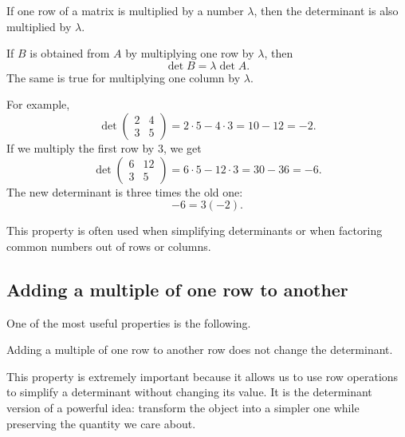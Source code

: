 If one row of a matrix is multiplied by a number \(\lambda\), then the determinant is also multiplied by \(\lambda\).

\begin{theorembox}
If \(B\) is obtained from \(A\) by multiplying one row by \(\lambda\), then
\[
\det B=\lambda \det A.
\]
The same is true for multiplying one column by \(\lambda\).
\end{theorembox}

For example,
\[
\det\begin{pmatrix}
2&4\\
3&5
\end{pmatrix}=2\cdot5-4\cdot3=10-12=-2.
\]
If we multiply the first row by \(3\), we get
\[
\det\begin{pmatrix}
6&12\\
3&5
\end{pmatrix}=6\cdot5-12\cdot3=30-36=-6.
\]
The new determinant is three times the old one:
\[
-6=3(-2).
\]

This property is often used when simplifying determinants or when factoring common numbers out of rows or columns.

\subsection{Adding a multiple of one row to another}

One of the most useful properties is the following.

\begin{theorembox}
Adding a multiple of one row to another row does not change the determinant.
\end{theorembox}

This property is extremely important because it allows us to use row operations to simplify a determinant without changing its value. It is the determinant version of a powerful idea: transform the object into a simpler one while preserving the quantity we care about.

